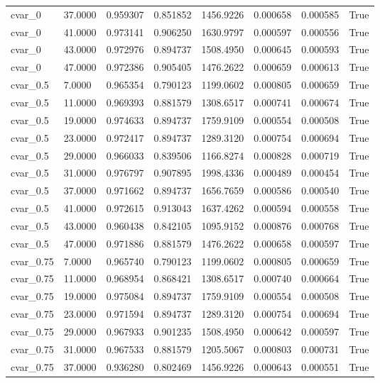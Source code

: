\documentclass[11pt]{report}
\begin{document}
\begin{longtable}{llllllll}
cvar\_0 & 37.0000 & 0.959307 & 0.851852 & 1456.9226 & 0.000658 & 0.000585 & True \\
cvar\_0 & 41.0000 & 0.973141 & 0.906250 & 1630.9797 & 0.000597 & 0.000556 & True \\
cvar\_0 & 43.0000 & 0.972976 & 0.894737 & 1508.4950 & 0.000645 & 0.000593 & True \\
cvar\_0 & 47.0000 & 0.972386 & 0.905405 & 1476.2622 & 0.000659 & 0.000613 & True \\
cvar\_0.5 & 7.0000 & 0.965354 & 0.790123 & 1199.0602 & 0.000805 & 0.000659 & True \\
cvar\_0.5 & 11.0000 & 0.969393 & 0.881579 & 1308.6517 & 0.000741 & 0.000674 & True \\
cvar\_0.5 & 19.0000 & 0.974633 & 0.894737 & 1759.9109 & 0.000554 & 0.000508 & True \\
cvar\_0.5 & 23.0000 & 0.972417 & 0.894737 & 1289.3120 & 0.000754 & 0.000694 & True \\
cvar\_0.5 & 29.0000 & 0.966033 & 0.839506 & 1166.8274 & 0.000828 & 0.000719 & True \\
cvar\_0.5 & 31.0000 & 0.976797 & 0.907895 & 1998.4336 & 0.000489 & 0.000454 & True \\
cvar\_0.5 & 37.0000 & 0.971662 & 0.894737 & 1656.7659 & 0.000586 & 0.000540 & True \\
cvar\_0.5 & 41.0000 & 0.972615 & 0.913043 & 1637.4262 & 0.000594 & 0.000558 & True \\
cvar\_0.5 & 43.0000 & 0.960438 & 0.842105 & 1095.9152 & 0.000876 & 0.000768 & True \\
cvar\_0.5 & 47.0000 & 0.971886 & 0.881579 & 1476.2622 & 0.000658 & 0.000597 & True \\
cvar\_0.75 & 7.0000 & 0.965740 & 0.790123 & 1199.0602 & 0.000805 & 0.000659 & True \\
cvar\_0.75 & 11.0000 & 0.968954 & 0.868421 & 1308.6517 & 0.000740 & 0.000664 & True \\
cvar\_0.75 & 19.0000 & 0.975084 & 0.894737 & 1759.9109 & 0.000554 & 0.000508 & True \\
cvar\_0.75 & 23.0000 & 0.971594 & 0.894737 & 1289.3120 & 0.000754 & 0.000694 & True \\
cvar\_0.75 & 29.0000 & 0.967933 & 0.901235 & 1508.4950 & 0.000642 & 0.000597 & True \\
cvar\_0.75 & 31.0000 & 0.967533 & 0.881579 & 1205.5067 & 0.000803 & 0.000731 & True \\
cvar\_0.75 & 37.0000 & 0.936280 & 0.802469 & 1456.9226 & 0.000643 & 0.000551 & True \\

\end{longtable}
\end{document}
